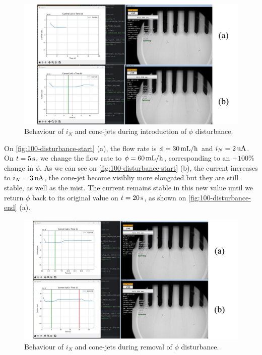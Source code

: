 \documentclass[oneside,12pt]{article}
\begin{document}
\begin{figure}[h!]
    \centering
    \includegraphics[width=\textwidth,trim=1 1 1 1,clip]{figures/100-disturbance-start.png}
    \caption{Behaviour of $i_N$ and cone-jets during introduction of $\phi$ disturbance.}
    \label{fig:100-disturbance-start}
\end{figure}

On \autoref{fig:100-disturbance-start} (a), the flow rate is $\phi = 30 \,\mathrm{mL/h}$ and $i_N = 2 \,\mathrm{uA}$. On $t = 5 \,\mathrm{s}$, 
we change the flow rate to $\phi = 60 \,\mathrm{mL/h}$, corresponding to an $+ 100\%$ change in $\phi$. As we can see on 
\autoref{fig:100-disturbance-start} (b), the current increases to $i_N = 3 \,\mathrm{uA}$, the cone-jet become visibliy more elongated 
but they are still stable, as well as the mist. The current remains stable in this new value until we return $\phi$ back to its
original value on $t = 20 \,\mathrm{s}$, as shown on \autoref{fig:100-disturbance-end} (a).

\begin{figure}[h!]
    \centering
    \includegraphics[width=\textwidth,trim=1 1 1 1,clip]{figures/100-disturbance-end.png}
    \caption{Behaviour of $i_N$ and cone-jets during removal of $\phi$ disturbance.}
    \label{fig:100-disturbance-end}
\end{figure}
\end{document}
